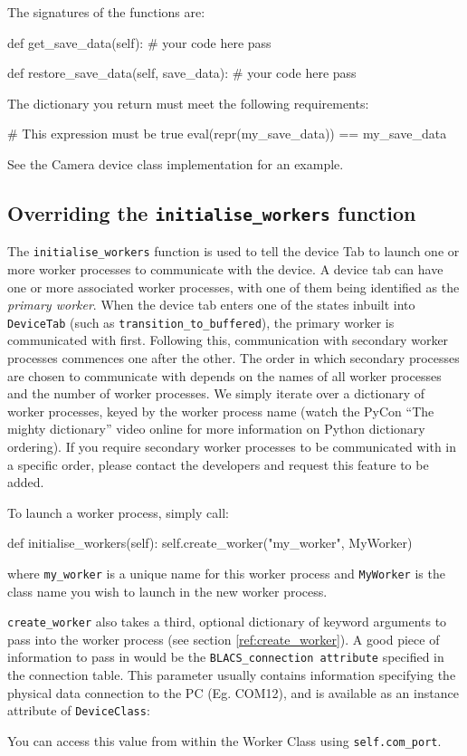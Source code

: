 \documentclass[12pt]{article}
\begin{document}
The signatures of the functions are:
\begin{python}
def get_save_data(self):
	# your code here
	pass
	
def restore_save_data(self, save_data):
	# your code here
	pass
\end{python}

The dictionary you return must meet the following requirements:
\begin{python}
# This expression must be true
eval(repr(my_save_data)) == my_save_data 
\end{python}

See the Camera device class implementation for an example.

\subsection{Overriding the \texttt{initialise\_workers} function}\label{tutorial:initialise_workers}
The \texttt{initialise\_workers} function is used to tell the device Tab to launch one or more worker processes to communicate with the device.
A device tab can have one or more associated worker processes, with one of them being identified as the \textit{primary worker}.
When the device tab enters one of the states inbuilt into \texttt{DeviceTab} (such as \texttt{transition\_to\_buffered}), the primary worker is communicated with first. 
Following this, communication with secondary worker processes commences one after the other.
The order in which secondary processes are chosen to communicate with depends on the names of all worker processes and the number of worker processes.
We simply iterate over a dictionary of worker processes, keyed by the worker process name (watch the PyCon ``The mighty dictionary'' video online for more information on Python dictionary ordering).
If you require secondary worker processes to be communicated with in a specific order, please contact the developers and request this feature to be added.

To launch a worker process, simply call:
\begin{python}
def initialise_workers(self):
    self.create_worker("my_worker", MyWorker)
\end{python}
where \texttt{my\_worker} is a unique name for this worker process and \texttt{MyWorker} is the class name you wish to launch in the new worker process.

\texttt{create\_worker} also takes a third, optional dictionary of keyword arguments to pass into the worker process (see section \ref{ref:create_worker}).
A good piece of information to pass in would be the \texttt{BLACS\_connection attribute} specified in the connection table.
This parameter usually contains information specifying the physical data connection to the PC (Eg. COM12), and is available as an instance attribute of \texttt{DeviceClass}:
\begin{python}
def initialise_workers(self):
    self.create_worker("my_worker", MyWorker,{'com_port':str(self.BLACS_connection))
\end{python}
You can access this value from within the Worker Class using \texttt{self.com\_port}.
\end{document}
